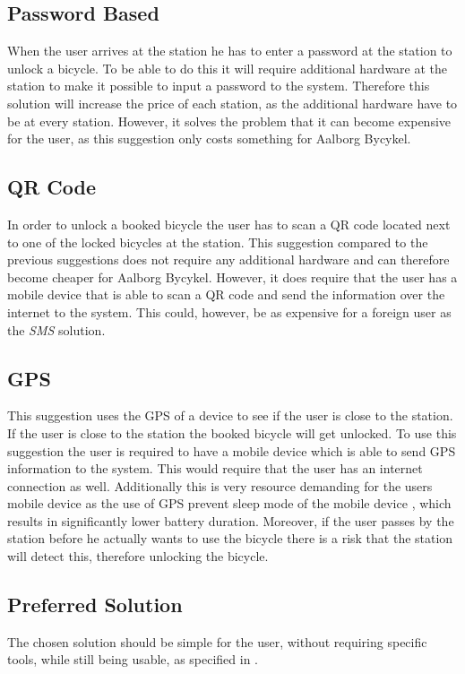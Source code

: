 \subsection{Password Based}
When the user arrives at the station he has to enter a password at the station to unlock a bicycle.
To be able to do this it will require additional hardware at the station to make it possible to input a password to the system.
Therefore this solution will increase the price of each station, as the additional hardware have to be at every station.
However, it solves the problem that it can become expensive for the user, as this suggestion only costs something for Aalborg Bycykel.

\subsection{QR Code}
In order to unlock a booked bicycle the user has to scan a QR code located next to one of the locked bicycles at the station.
This suggestion compared to the previous suggestions does not require any additional hardware and can therefore become cheaper for Aalborg Bycykel.
However, it does require that the user has a mobile device that is able to scan a QR code and send the information over the internet to the system. This could, however, be as expensive for a foreign user as the \textit{SMS} solution.

\subsection{GPS}
This suggestion uses the GPS of a device to see if the user is close to the station.
If the user is close to the station the booked bicycle will get unlocked.
To use this suggestion the user is required to have a mobile device which is able to send GPS information to the system.
This would require that the user has an internet connection as well.
Additionally this is very resource demanding for the users mobile device as the use of GPS prevent sleep mode of the mobile device \citep{misc:gpsbatteryusage}, which results in significantly lower battery duration.
Moreover, if the user passes by the station before he actually wants to use the bicycle there is a risk that the station will detect this, therefore unlocking the bicycle.

\subsection{Preferred Solution}
The chosen solution should be simple for the user, without requiring specific tools, while still being usable, as specified in .

